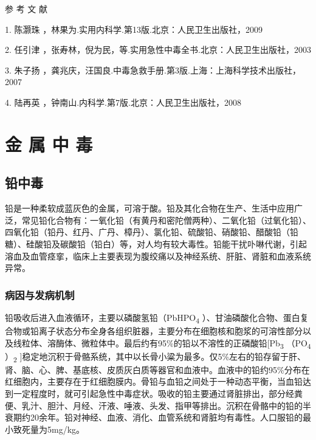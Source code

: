 \protect\hypertarget{text00156.html}{}{}

\hypertarget{text00156.htmlux5cux23CHP5-5-6}{}
参 考 文 献

1. 陈灏珠 ，林果为.实用内科学.第13版.北京：人民卫生出版社，2009

2. 任引津
，张寿林，倪为民，等.实用急性中毒全书.北京：人民卫生出版社，2003

3. 朱子扬
，龚兆庆，汪国良.中毒急救手册.第3版.上海：上海科学技术出版社，2007

4. 陆再英 ，钟南山.内科学.第7版.北京：人民卫生出版社，2008

\protect\hypertarget{text00157.html}{}{}

\chapter{金 属 中 毒}

\section{铅中毒}

铅是一种柔软成蓝灰色的金属，可溶于酸。铅及其化合物在生产、生活中应用广泛，常见铅化合物有：一氧化铅（有黄丹和密陀僧两种）、二氧化铅（过氧化铅）、四氧化铅（铅丹、红丹、广丹、樟丹）、氯化铅、硫酸铅、硝酸铅、醋酸铅（铅糖）、硅酸铅及碳酸铅（铅白）等，对人均有较大毒性。铅能干扰卟啉代谢，引起溶血及血管痉挛，临床上主要表现为腹绞痛以及神经系统、肝脏、肾脏和血液系统异常。

\subsection{病因与发病机制}

铅吸收后进入血液循环，主要以磷酸氢铅（PbHPO\textsubscript{4}
）、甘油磷酸化合物、蛋白复合物或铅离子状态分布全身各组织脏器，主要分布在细胞核和胞浆的可溶性部分以及线粒体、溶酶体、微粒体中。最后约有95\%的铅以不溶性的正磷酸铅{[}Pb\textsubscript{3}
（PO\textsubscript{4} ）\textsubscript{2}
{]}稳定地沉积于骨骼系统，其中以长骨小粱为最多。仅5\%左右的铅存留于肝、肾、脑、心、脾、基底核、皮质灰白质等器官和血液中。血液中的铅约95\%分布在红细胞内，主要存在于红细胞膜内。骨铅与血铅之间处于一种动态平衡，当血铅达到一定程度时，就可引起急性中毒症状。吸收的铅主要通过肾脏排出，部分经粪便、乳汁、胆汁、月经、汗液、唾液、头发、指甲等排出。沉积在骨骼中的铅的半衰期约20余年。铅对神经、血液、消化、血管系统和肾脏均有毒性。人口服铅的最小致死量为5mg/kg。

